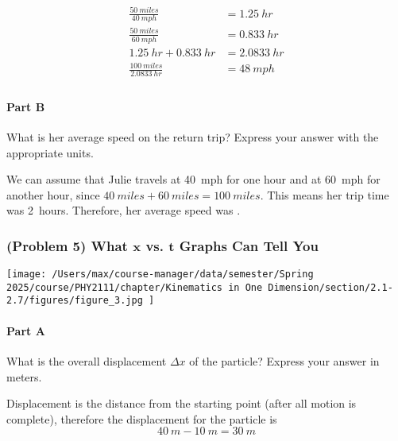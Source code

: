 \begin{solution}
	\begin{align*}
		\frac{\SI{50}{miles}}{\SI{40}{mph}} &= \SI{1.25}{hr} \\
		\frac{\SI{50}{miles}}{\SI{60}{mph}} &= \SI{0.833}{hr} \\
		\SI{1.25}{hr} + \SI{0.833}{hr} &= \SI{2.0833}{hr} \\
		\frac{\SI{100}{miles}}{\SI{2.0833}{hr}} &= \boxed{\SI{48}{mph}} \\
	\end{align*}
\end{solution}

\paragraph{Part B}
What is her average speed on the return trip?
Express your answer with the appropriate units.

\begin{solution}
	We can assume that Julie travels at \SI{40}{mph} for one hour and at \SI{60}{mph} for another hour, since $\SI{40}{miles} + \SI{60}{miles} = \SI{100}{miles}$. This means her trip time was \SI{2}{hours}. Therefore, her average speed was .
\end{solution}

\newpage

\subsubsection{(Problem 5) What $\mathbf{x}$ vs. $\mathbf{t}$ Graphs Can Tell You}

\begin{center}
	\texttt{[image: /Users/max/course-manager/data/semester/Spring 2025/course/PHY2111/chapter/Kinematics in One Dimension/section/2.1-2.7/figures/figure\_3.jpg
	]}
\end{center}

\paragraph{Part A}
What is the overall displacement $\Delta x$ of the particle? Express your answer in meters.

\begin{solution}
	Displacement is the distance from the starting point (after all motion is complete), therefore the displacement for the particle is
	\[
		\SI{40}{m}-\SI{10}{m}=\boxed{\SI{30}{m}}
	\]
\end{solution}

